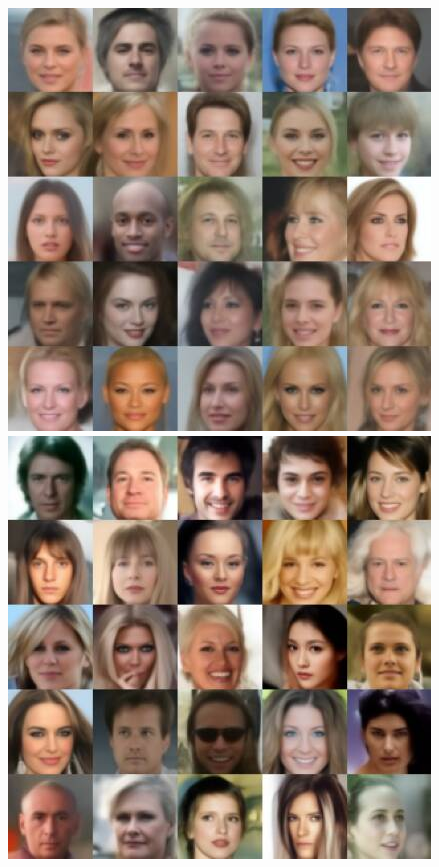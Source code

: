  \begin{figure}[ht!]
 \centering
{}
  \includegraphics[width=\linewidth]{figs/imgs/ddpm_ddim_celeba64_data_samples_T_800_5_steps_25.jpg}
\endminipage \hfill
  \includegraphics[width=\linewidth]{figs/imgs/ddpm_ddim_celeba64_data_samples_T_500_5_steps_ga_25.jpg}

\end{figure}
